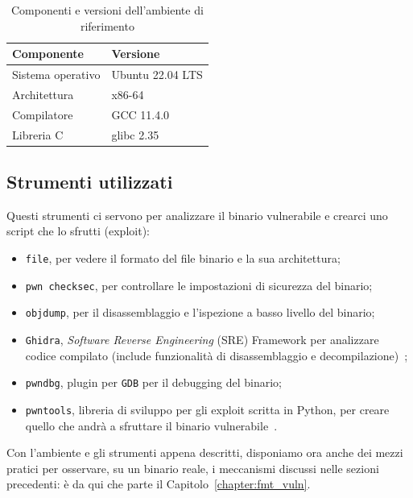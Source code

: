 \begin{table}[ht]
    \centering
    \caption{Componenti e versioni dell'ambiente di riferimento}
    \label{tab:ambiente_riferimento}
    \begin{tabular}{ll}
        \toprule
        Componente & Versione \\
        \midrule
        Sistema operativo & Ubuntu 22.04 LTS \\
        Architettura & x86-64 \\
        Compilatore & GCC 11.4.0 \\
        Libreria C & glibc 2.35 \\
        \bottomrule
    \end{tabular}
\end{table}

\subsection{Strumenti utilizzati}\label{subsec:tools}
Questi strumenti ci servono per analizzare il binario vulnerabile e crearci uno script che lo sfrutti (exploit):
\begin{itemize}
    \item \texttt{file}, per vedere il formato del file binario e la sua architettura;
    \item \texttt{pwn checksec}, per controllare le impostazioni di sicurezza del binario;
    \item \texttt{objdump}, per il disassemblaggio e l'ispezione a basso livello del binario;
    \item \texttt{Ghidra}, \emph{Software Reverse Engineering} (SRE) Framework per analizzare codice compilato (include funzionalità di disassemblaggio e decompilazione)~\cite{ghidra};
    \item \texttt{pwndbg}, plugin per \texttt{GDB} per il debugging del binario;
    \item \texttt{pwntools}, libreria di sviluppo per gli exploit scritta in Python, per creare quello che andrà a sfruttare il binario vulnerabile~\cite{pwntools}.
\end{itemize}

Con l'ambiente e gli strumenti appena descritti, disponiamo ora anche dei mezzi pratici per osservare, su un binario reale, i meccanismi discussi nelle sezioni precedenti: è da qui che parte il Capitolo~\ref{chapter:fmt_vuln}.
